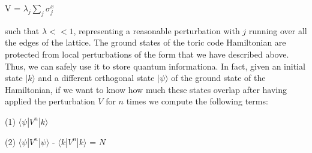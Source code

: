 \documentclass{Configuration_Files/PoliMi3i_thesis}
\begin{document}
\begin{center}
	V = $\lambda_j \sum_{j} \sigma^x_j $
\end{center}

such that $\lambda << 1 $, representing a reasonable perturbation with $j$ running over all the edges of the lattice. \newline
The ground states of the toric code Hamiltonian are protected from local perturbations of the form that we have described above. Thus, we can safely use it to store quantum informationa. In fact, given an initial state $ |k \rangle $ and  a different orthogonal state $ |\psi \rangle $ of the ground state of the Hamiltonian, if we want to know how much these states overlap after having applied the perturbation $V$ for $n$ times we compute the following terms:

\begin{center}
	 (1) $ \langle \psi|V^n| k \rangle$                                         
\end{center}
\begin{center}
     (2) $ \langle \psi|V^n| \psi \rangle$ - $ \langle k|V^n| k \rangle$ = $N$  
\end{center}
\end{document}
